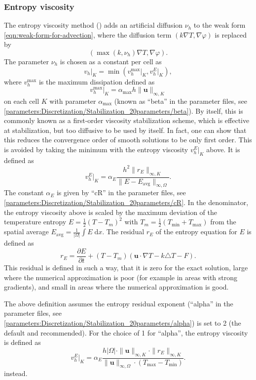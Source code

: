 \documentclass{article}
\begin{document}
\subsubsection{Entropy viscosity}

The entropy viscosity method (\cite{GPP11,KHB12}) adds an artificial diffusion $\nu_h$ to the weak form \eqref{eqn:weak-form-for-advection}, where the diffusion term $\left (k\nabla T, \nabla \varphi \right)$ is replaced by
\[
\left(\max (k, \nu_h) \nabla T, \nabla \varphi \right).
\]
The parameter $\nu_h$ is chosen as a constant per cell as
\[
 v_h \vert_K = \min \left( v_h^\text{max} \vert_K, v_h^E \vert_K \right),
\]
where $v_h^\text{max}$ is the maximum dissipation defined as
\[
 v_h^\text{max} \vert_K = \alpha_\text{max} h \| \mathbf u \|_{\infty,K}
\]
on each cell $K$ with parameter $\alpha_\text{max}$ (known as ``beta'' in the parameter 
files, see  \ref{parameters:Discretization/Stabilization_20parameters/beta}). By itself, this is commonly known as a first-order viscosity 
stabilization scheme, which is effective at stabilization, but too diffusive to
be used by itself. In fact, one can show that this reduces the convergence order
of smooth solutions to be only first order.
This is avoided by taking the minimum with the entropy viscosity $v_h^E|_K$
above. It is defined as
\[
 v_h^E \vert_K = \alpha_E \frac{h^2 \| r_E \|_{\infty, K}}{\| E - E_\text{avg} \|_{\infty, \Omega}}.
\]
The constant $\alpha_E$ is given by ``cR'' in the parameter files, see \ref{parameters:Discretization/Stabilization_20parameters/cR}.
In the denominator, the entropy viscosity above is scaled by
the maximum deviation of the temperature
entropy $E=\frac{1}{2}(T-T_m)^2$ with $T_m = \frac{1}{2}(T_\text{min}+T_\text{max})$
from the spatial average $E_\text{avg} = \frac{1}{| \Omega |}\int E \;\text{d}x$.
The residual $r_E$ of the entropy equation for $E$ is defined as
\[
 r_E = \frac{\partial E}{\partial t} + (T-T_m)(\mathbf{u}\cdot \nabla T - k\triangle T - F).
\]
This residual is defined in such a way, that it is zero for the exact solution, large
where the numerical approximation is poor (for example in areas with strong gradients),
and small in areas where the numerical approximation is good.

The above definition assumes the entropy residual exponent (``alpha'' in the parameter files,
see \ref{parameters:Discretization/Stabilization_20parameters/alpha}) is set to 2 (the default
and recommended). For the choice of 1 for ``alpha'', the entropy viscosity is defined as
\[
 v_h^E \vert_K = \alpha_E \frac{h |\Omega| \cdot \| \mathbf u \|_{\infty,K} \cdot \| r_E \|_{\infty, K}}
 {\| \mathbf u \|_{\infty,\Omega} \cdot (T_\text{max} - T_\text{min})}.
\]
instead.
\end{document}
